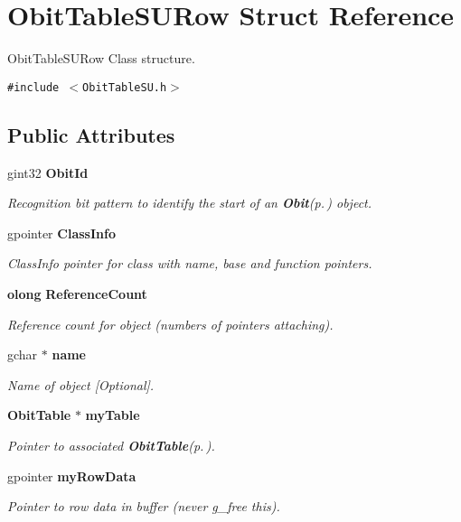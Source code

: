 \section{Obit\-Table\-SURow Struct Reference}
\label{structObitTableSURow}
Obit\-Table\-SURow Class structure.  


{\tt \#include $<$Obit\-Table\-SU.h$>$}

\subsection*{Public Attributes}
\begin{CompactItemize}
\item 
gint32 {\bf Obit\-Id}
\begin{CompactList}\small\item\em Recognition bit pattern to identify the start of an {\bf Obit}{\rm (p.\,\pageref{structObit})} object. \item\end{CompactList}\item 
gpointer {\bf Class\-Info}
\begin{CompactList}\small\item\em Class\-Info pointer for class with name, base and function pointers. \item\end{CompactList}\item 
{\bf olong} {\bf Reference\-Count}
\begin{CompactList}\small\item\em Reference count for object (numbers of pointers attaching). \item\end{CompactList}\item 
gchar $\ast$ {\bf name}
\begin{CompactList}\small\item\em Name of object [Optional]. \item\end{CompactList}\item 
{\bf Obit\-Table} $\ast$ {\bf my\-Table}
\begin{CompactList}\small\item\em Pointer to associated {\bf Obit\-Table}{\rm (p.\,\pageref{structObitTable})}. \item\end{CompactList}\item 
gpointer {\bf my\-Row\-Data}
\begin{CompactList}\small\item\em Pointer to row data in buffer (never g\_\-free this). \item\end{CompactList}\item 

\end{CompactItemize}
